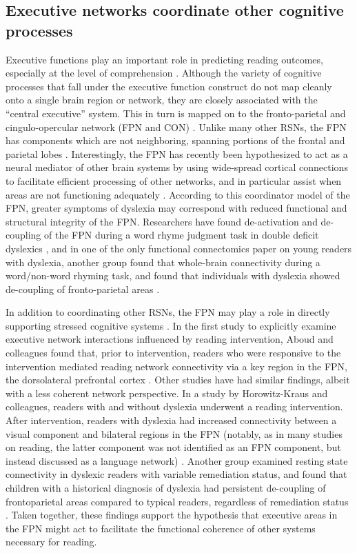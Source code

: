 \subsection{Executive networks coordinate other cognitive processes} 
Executive functions play an important role in predicting reading outcomes, especially at the level of comprehension \citep{Cutting2009a}. Although the variety of cognitive processes that fall under the executive function construct do not map cleanly onto a single brain region or network, they are closely associated with the ``central executive'' system. This in turn is mapped on to the fronto-parietal and cingulo-opercular network (FPN and CON) \citep{Fedorenko2014a, Cocchi2013}. Unlike many other RSNs, the FPN has components which are not neighboring, spanning portions of the frontal and parietal lobes \citep{Yeo2011}. Interestingly, the FPN has recently been hypothesized to act as a neural mediator of other brain systems by using wide-spread cortical connections to facilitate efficient processing of other networks, and in particular assist when areas are not functioning adequately  \citep{Menon2010, Cole2014}. According to this coordinator model of the FPN, greater symptoms of dyslexia may correspond with reduced functional and structural integrity of the FPN. Researchers have found de-activation and de-coupling of the FPN during a word rhyme judgment task in double deficit dyslexics \citep{Norton2014}, and in one of the only functional connectomics paper on young readers with dyslexia, another group found that whole-brain connectivity during a word/non-word rhyming task, and found that individuals with dyslexia showed de-coupling of fronto-parietal areas \citep{Finn2014}. 

In addition to coordinating other RSNs, the FPN may play a role in directly supporting stressed cognitive systems \citep{Cole2014}. In the first study to explicitly examine executive network interactions influenced by reading intervention, Aboud and colleagues found that, prior to intervention, readers who were responsive to the intervention mediated reading network connectivity via a key region in the FPN, the dorsolateral prefrontal cortex \citep{Aboud2018}.  Other studies have had similar findings, albeit with a less coherent network perspective. In a study by Horowitz-Kraus and colleagues, readers with and without dyslexia underwent a reading intervention. After intervention, readers with dyslexia had increased connectivity between a visual component and bilateral regions in the FPN (notably, as in many studies on reading, the latter component was not identified as an FPN component, but instead discussed as a language network) \citep{HorowitzKraus2015}. Another group examined resting state connectivity in dyslexic readers with variable remediation status, and found that children with a historical diagnosis of dyslexia had persistent de-coupling of frontoparietal areas compared to typical readers, regardless of remediation status \citep{Koyama2013}. Taken together, these findings support the hypothesis that executive areas in the FPN might act to facilitate the functional coherence of other systems necessary for reading.

